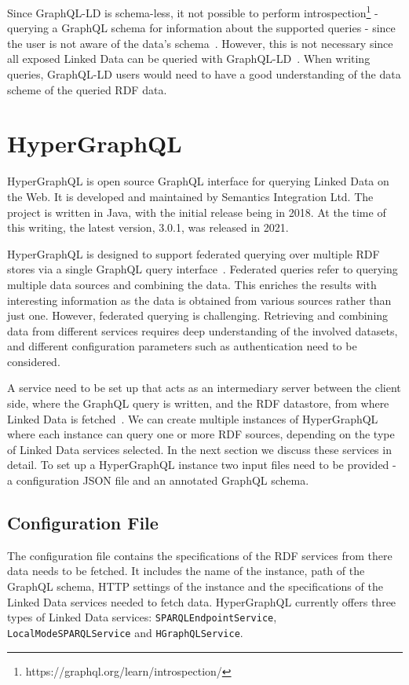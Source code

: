 Since GraphQL-LD is schema-less, it not possible to perform introspection\footnote{https://graphql.org/learn/introspection/} -  querying a GraphQL schema for information about the supported queries - since the user is not aware of the data's schema~\cite{Gleim2020}. However, this is not necessary since all exposed Linked Data can be queried with GraphQL-LD~\cite{Werbrouck2019a}. When writing queries, GraphQL-LD users would need to have a good understanding of the data scheme of the queried RDF data.  


\section{HyperGraphQL}

HyperGraphQL is open source GraphQL interface for querying Linked Data on the Web. It is developed and maintained by Semantics Integration Ltd. The project is written in Java, with the initial release being in 2018. At the time of this writing, the latest version, 3.0.1, was released in 2021.

HyperGraphQL is designed to support federated querying over multiple RDF stores via a single GraphQL query interface~\cite{Taelman2019}. Federated queries refer to querying multiple data sources and combining the data. This enriches the results with interesting information as the data is obtained from various sources rather than just one. However, federated querying is challenging. Retrieving and combining data from different services requires deep understanding of the involved datasets, and different configuration parameters such as authentication need to be considered. 

A service need to be set up that acts as an intermediary server between the client side, where the GraphQL query is written, and the RDF datastore, from where Linked Data is fetched~\cite{Taelman2018}. We can create multiple instances of HyperGraphQL where each instance can query one or more RDF sources, depending on the type of Linked Data services selected. In the next section we discuss these services in detail. To set up a HyperGraphQL instance two input files need to be provided - a configuration JSON file and an annotated GraphQL schema.

\subsection{Configuration File}
\label{subsec:configuration}

The configuration file contains the specifications of the RDF services from there data needs to be fetched. It includes the name of the instance, path of the GraphQL schema, HTTP settings of the instance and the specifications of the Linked Data services needed to fetch data. HyperGraphQL currently offers three types of Linked Data services: \texttt{SPARQLEndpointService}, \texttt{LocalModeSPARQLService} and \texttt{HGraphQLService}. 

